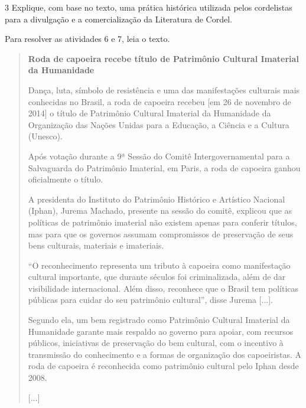 \num{3} Explique, com base no texto, uma prática histórica utilizada
  pelos cordelistas para a divulgação e a comercialização da Literatura
  de Cordel.


Para resolver as atividades 6 e 7, leia o texto.

\begin{quote}
\textbf{Roda de capoeira recebe título de Patrimônio Cultural Imaterial da Humanidade}

Dança, luta, símbolo de resistência e uma das manifestações culturais mais 
conhecidas no Brasil, a roda de capoeira recebeu [em 26 de novembro de 2014] 
o título de Patrimônio Cultural Imaterial da Humanidade da Organização das 
Nações Unidas para a Educação, a Ciência e a Cultura (Unesco).

Após votação durante a 9ª Sessão do Comitê Intergovernamental para a Salvaguarda 
do Patrimônio Imaterial, em Paris, a roda de capoeira ganhou oficialmente o título.

A presidenta do Instituto do Patrimônio Histórico e Artístico Nacional (Iphan), 
Jurema Machado, presente na sessão do comitê, explicou que as políticas de patrimônio 
imaterial não existem apenas para conferir títulos, mas para que os governos 
assumam compromissos de preservação de seus bens culturais, materiais e imateriais.

``O reconhecimento representa um tributo à capoeira como manifestação cultural 
importante, que durante séculos foi criminalizada, além de dar visibilidade 
internacional. Além disso, reconhece que o Brasil tem políticas públicas para cuidar 
do seu patrimônio cultural'', disse Jurema {[}...{]}.

Segundo ela, um bem registrado como Patrimônio Cultural Imaterial da Humanidade 
garante mais respaldo ao governo para apoiar, com recursos públicos, iniciativas 
de preservação do bem cultural, com o incentivo à transmissão do conhecimento e a 
formas de organização dos capoeiristas. A roda de capoeira é reconhecida como 
patrimônio cultural pelo Iphan desde 2008.

{[}...{]}

\end{quote}

